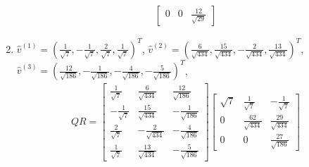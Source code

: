 \begin{Answer}
\begin{enumerate}[label=(\alph*)]
\begin{align*}
\begin{bmatrix}
0&0&\frac{12}{\sqrt{29}}
\end{bmatrix}
\end{align*}
\item $\hat{v}^{(1)} = (\frac{1}{\sqrt{7}}, -\frac{1}{\sqrt{7}}, \frac{2}{\sqrt{7}}, \frac{1}{\sqrt{7}})^T$, $\hat{v}^{(2)} = (\frac{6}{\sqrt{434}}, \frac{15}{\sqrt{434}}, -\frac{2}{\sqrt{434}}, \frac{13}{\sqrt{434}})^T$, \\
$\hat{v}^{(3)} = (\frac{12}{\sqrt{186}}, -\frac{1}{\sqrt{186}}, -\frac{4}{\sqrt{186}}, -\frac{5}{\sqrt{186}})^T$,
\begin{align*}
QR =
\begin{bmatrix}
\frac{1}{\sqrt{7}} & \frac{6}{\sqrt{434}} & \frac{12}{\sqrt{186}} \\
-\frac{1}{\sqrt{7}} & \frac{15}{\sqrt{434}} & -\frac{1}{\sqrt{186}} \\
\frac{2}{\sqrt{7}} & -\frac{2}{\sqrt{434}} & -\frac{4}{\sqrt{186}} \\
\frac{1}{\sqrt{7}} & \frac{13}{\sqrt{434}} & -\frac{5}{\sqrt{186}}
\end{bmatrix}
\begin{bmatrix}
\sqrt{7}&\frac{1}{\sqrt{7}}&-\frac{1}{\sqrt{7}}\\ 
0&\frac{62}{\sqrt{434}}&\frac{29}{\sqrt{434}}\\ 
0&0&\frac{27}{\sqrt{186}}
\end{bmatrix}
\end{align*}
\end{enumerate}
\end{Answer}
